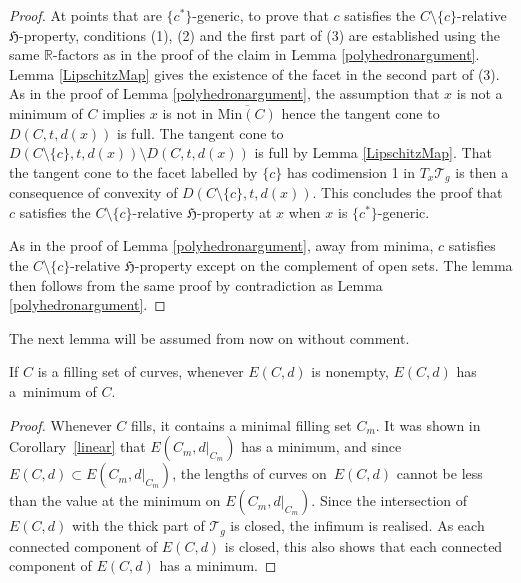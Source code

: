 \begin{proof}
At points that are $\{c^{*}\}$-generic, to prove that $c$ satisfies the $C\setminus \{c\}$-relative $\mathfrak{H}$-property, conditions (1), (2) and the first part of (3) are established using the same $\mathbb{R}$-factors as in the proof of the claim in Lemma \ref{polyhedronargument}. Lemma \ref{LipschitzMap} gives the existence of the facet in the second part of (3). As in the proof of Lemma \ref{polyhedronargument}, the assumption that $x$ is not a minimum of $C$ implies $x$ is not in $\overline{\mathrm{Min}(C)}$ hence the tangent cone to $D(C,t,d(x))$ is full. The tangent cone to~${D(C\setminus \{c\},t,d(x))\setminus D(C,t,d(x))}$ is full by Lemma \ref{LipschitzMap}. That the tangent cone to the facet labelled by $\{c\}$ has codimension 1 in $T_{x}\mathcal{T}_{g}$ is then a consequence of convexity of $D(C\setminus \{c\},t,d(x))$. This concludes the proof that $c$ satisfies the $C\setminus \{c\}$-relative $\mathfrak{H}$-property at $x$ when $x$ is $\{c^{*}\}$-generic.

As in the proof of Lemma \ref{polyhedronargument}, away from minima, $c$ satisfies the $C\setminus \{c\}$-relative $\mathfrak{H}$-property except on the complement of open sets. The lemma then follows from the same proof by contradiction as Lemma \ref{polyhedronargument}.
\end{proof}

The next lemma will be assumed from now on without comment.

\begin{Lemma}
\label{connectedminima}
If $C$ is a filling set of curves, whenever $E(C,d)$ is nonempty, $E(C,d)$ has a~minimum of $C$.
\end{Lemma}
\begin{proof}
Whenever $C$ fills, it contains a minimal filling set $C_{m}$. It was shown in Corollary~\ref{linear} that $E(C_{m}, d|_{C_{m}})$ has a minimum, and since $E(C,d)\subset E(C_{m}, d|_{C_{m}})$, the lengths of curves on~$E(C,d)$ cannot be less than the value at the minimum on $E(C_{m}, d|_{C_{m}})$. Since the intersection of $E(C,d)$ with the thick part of $\mathcal{T}_{g}$ is closed, the infimum is realised. As each connected component of $E(C,d)$ is closed, this also shows that each connected component of $E(C,d)$ has a minimum.
\end{proof}


